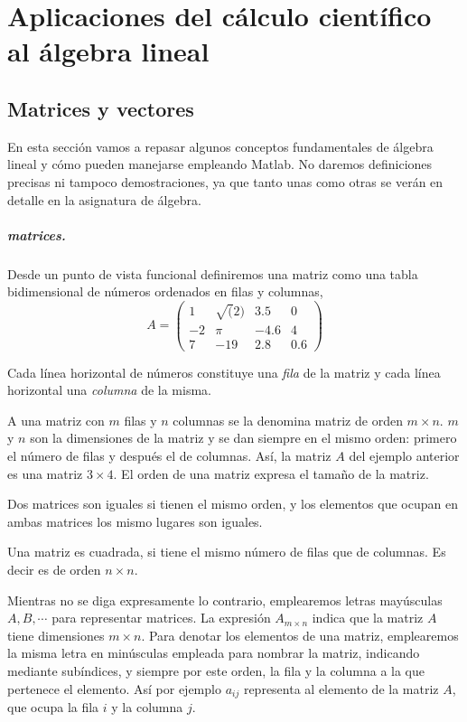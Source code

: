 \chapter{Aplicaciones del cálculo científico al álgebra lineal}
\section{Matrices y vectores}
En esta sección vamos a repasar algunos conceptos fundamentales de  álgebra lineal y cómo pueden manejarse empleando Matlab. No daremos definiciones precisas ni tampoco demostraciones, ya que tanto unas como otras se verán en detalle en la asignatura de álgebra. 
\paragraph{matrices.} Desde un punto de vista funcional definiremos una matriz como una tabla bidimensional de números ordenados en filas y columnas,
\begin{equation*}
A=
\begin{pmatrix}
1& \sqrt(2)& 3.5& 0\\
-2& \pi& -4.6& 4\\
7& -19& 2.8& 0.6
\end{pmatrix}
\end{equation*}

Cada línea horizontal de números constituye una \emph{fila} de la matriz y cada línea horizontal una \emph{columna} de la misma.

A una matriz con $m$ filas y $n$ columnas se la denomina matriz de orden $m\times n$. $m$ y $n$ son la dimensiones de la matriz y se dan siempre en el mismo orden: primero el número de filas y después el de columnas. Así, la matriz $A$ del ejemplo anterior es una matriz $3\times 4$. El orden de una matriz expresa el tamaño de la matriz.

Dos matrices son iguales si tienen el mismo orden, y los elementos que ocupan en ambas matrices los mismo lugares son iguales.

Una matriz es cuadrada, si tiene el mismo número de filas que de columnas. Es decir es de orden $n\times n$.

Mientras no se diga expresamente lo contrario, emplearemos letras mayúsculas $A, B, \cdots$ para representar matrices. La expresión $A_{m\times n}$ indica que la matriz $A$ tiene dimensiones $m \times n$. Para denotar los elementos de una matriz, emplearemos la misma letra en minúsculas empleada para nombrar la matriz, indicando mediante subíndices, y siempre por este orden, la fila y la columna a la que pertenece el elemento. Así por ejemplo $a_{ij}$ representa al elemento de la matriz $A$, que ocupa la fila $i$ y la columna $j$.

